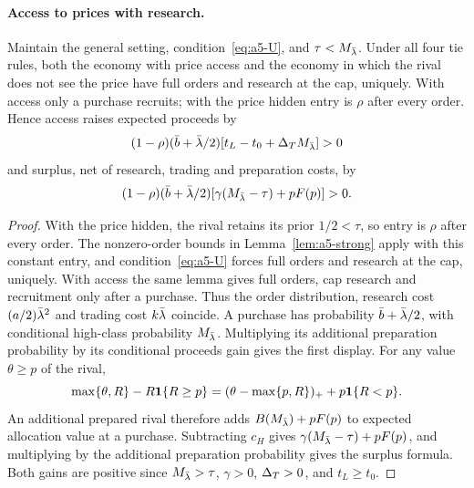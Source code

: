 \paragraph{Access to prices with research.}
Maintain the general setting, condition~\eqref{eq:a5-U}, and \(\tau<M_{\bar\lambda}\). Under all four tie rules, both the
economy with price access and the economy in which the rival does not see the price have full orders and
research at the cap, uniquely. With access only a purchase recruits; with the price hidden entry is \(\rho\)
after every order. Hence access raises expected proceeds by
\[
 (1-\rho)(\bar b+\bar\lambda/2)[t_L-t_0+\Delta_T M_{\bar\lambda}]>0
\]
and surplus, net of research, trading and preparation costs, by
\[
 (1-\rho)(\bar b+\bar\lambda/2)[\gamma(M_{\bar\lambda}-\tau)+pF(p)]>0.
\]

\begin{proof}
With the price hidden, the rival retains its prior \(1/2<\tau\), so entry is \(\rho\) after every order.
The nonzero-order bounds in Lemma~\ref{lem:a5-strong} apply with this constant entry, and condition~\eqref{eq:a5-U}
forces full orders and research at the cap, uniquely. With access the same lemma gives full orders, cap
research and recruitment only after a purchase. Thus the order distribution, research cost \((a/2)\bar\lambda^2\) and trading
cost \(k\bar\lambda\) coincide. A purchase has probability \(\bar b+\bar\lambda/2\), with conditional high-class probability
\(M_{\bar\lambda}\). Multiplying its additional preparation probability by its conditional proceeds gain gives
the first display.
For any value \(\theta\ge p\) of the rival,
\[
 \max\{\theta,R\}-R\mathbf{1}\{R\ge p\}
 =(\theta-\max\{p,R\})_++p\mathbf{1}\{R<p\}.
\]
An additional prepared rival therefore adds \(B(M_{\bar\lambda})+pF(p)\) to expected allocation value at a
purchase. Subtracting \(c_H\) gives \(\gamma(M_{\bar\lambda}-\tau)+pF(p)\), and multiplying by the additional
preparation probability gives the surplus formula. Both gains are positive since
\(M_{\bar\lambda}>\tau\), \(\gamma>0\), \(\Delta_T>0\), and \(t_L\ge t_0\).
\end{proof}

